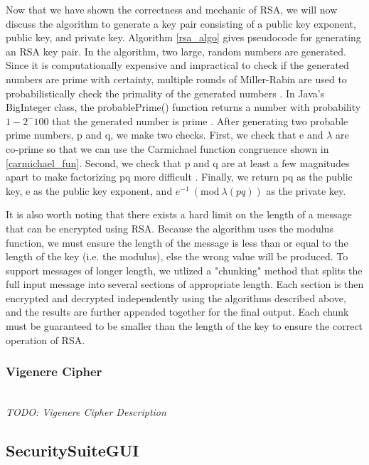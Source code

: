 \documentclass[acmlarge]{acmart}
\newcommand{\Mod}[1]{\ (\mathrm{mod}\ #1)}
\begin{document}
Now that we have shown the correctness and mechanic of RSA, we will now discuss the algorithm to generate a key pair consisting of a public key exponent, public key, and private key. Algorithm \ref{rsa_algo} gives pseudocode for generating an RSA key pair. In the algorithm, two large, random numbers are generated. Since it is computationally expensive and impractical to check if the generated numbers are prime with certainty, multiple rounds of Miller-Rabin are used to probabilistically check the primality of the generated numbers \cite{MillerRabin}. In Java's BigInteger class, the probablePrime() function returns a number with probability $1 - 2^-100$ that the generated number is prime \cite{BigIntegerDoc}. After generating two probable prime numbers, p and q, we make two checks. First, we check that e and $\lambda$ are co-prime so that we can use the Carmichael function congruence shown in \ref{carmichael_fun}. Second, we check that p and q are at least a few magnitudes apart to make factorizing pq more difficult \cite{RSA}. Finally, we return pq as the public key, e as the public key exponent, and $e^{-1} \Mod{\lambda(pq)}$ as the private key.

It is also worth noting that there exists a hard limit on the length of a message that can be encrypted using RSA. Because the algorithm uses the modulus function, we must ensure the length of the message is less than or equal to the length of the key (i.e. the modulus), else the wrong value will be produced. To support messages of longer length, we utlized a "chunking" method that splits the full input message into several sections of appropriate length. Each section is then encrypted and decrypted independently using the algorithms described above, and the results are further appended together for the final output. Each chunk must be guaranteed to be smaller than the length of the key to ensure the correct operation of RSA.

\subsubsection{Vigenere Cipher}
\hspace*{\fill} \\ %
\textit{TODO: Vigenere Cipher Description}

\subsection{SecuritySuiteGUI}\label{sec:gui}
\end{document}
